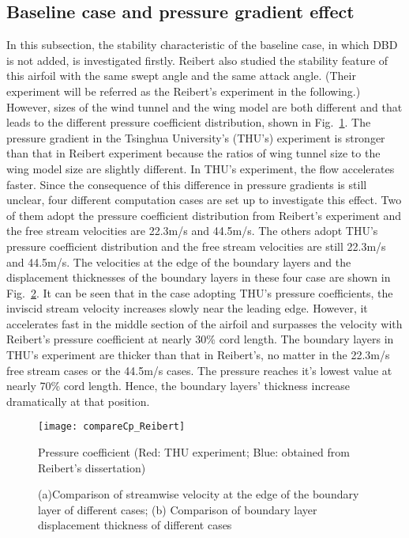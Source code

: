 \documentclass{AIAA}
\begin{document}
\subsection{Baseline case and pressure gradient effect}
In this subsection, the stability characteristic of the baseline case, in which DBD is not added, is investigated firstly. Reibert \cite{Reiberit1996} also studied the stability feature of this airfoil with the same swept angle and the same attack angle. (Their experiment will be referred as the Reibert's experiment in the following.) However, sizes of the wind tunnel and the wing model are both different and that leads to the different pressure coefficient distribution, shown in Fig.~\ref{f:CpCompare}. The pressure gradient in the Tsinghua University's (THU's) experiment is stronger than that in Reibert experiment because the ratios of wing tunnel size to the wing model size are slightly different. In THU's experiment, the flow accelerates faster. Since the consequence of this difference in pressure gradients is still unclear, four different computation cases are set up to investigate this effect. Two of them adopt the pressure coefficient distribution from Reibert's experiment and the free stream velocities are 22.3m/s and 44.5m/s. The others adopt THU's pressure coefficient distribution and the free stream velocities are still 22.3m/s and 44.5m/s. The velocities at the edge of the boundary layers and the displacement thicknesses of the boundary layers in these four case are shown in Fig.~\ref{fig:CompOutFlow}. It can be seen that in the case adopting THU's pressure coefficients, the inviscid stream velocity increases slowly near the leading edge. However, it accelerates fast in the middle section of the airfoil and surpasses the velocity with Reibert's pressure coefficient at nearly 30\% cord length. The boundary layers in THU's experiment are thicker than that in Reibert's, no matter in the 22.3m/s free stream cases or the 44.5m/s cases. The pressure reaches it's lowest value at nearly 70\% cord length. Hence, the boundary layers' thickness increase dramatically at that position.
\begin{figure}
\centering
  \texttt{[image: compareCp\_Reibert]}
  \caption{Pressure coefficient (Red: THU experiment; Blue: obtained from Reibert's dissertation\cite{Reiberit1996})}\label{f:CpCompare}
\end{figure}
\begin{figure}
\centering
{}
\caption{(a)Comparison of streamwise velocity at the edge of the boundary layer of different cases; (b) Comparison of boundary layer displacement thickness of different cases}
\label{fig:CompOutFlow} %
\end{figure}
\end{document}
